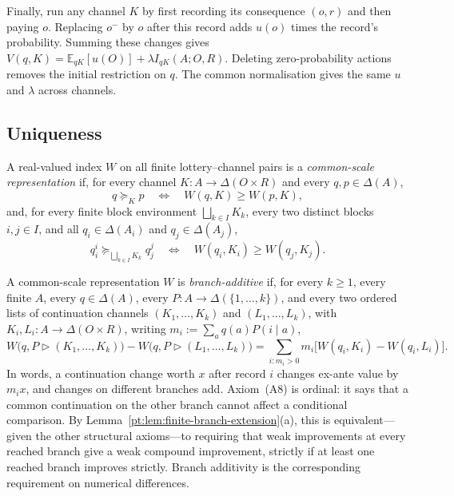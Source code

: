 \documentclass[11pt,a4paper]{article}
\theoremstyle{definition}
\newcommand{\D}{\Delta}
\newcommand{\E}{\mathbb E}
\newcommand{\1}{\mathbf 1}
\begin{document}
Finally, run any channel $K$ by first recording its consequence $(o,r)$ and
then paying $o$. Replacing $o^-$ by $o$ after this record adds $u(o)$ times
the record's probability. Summing these changes gives
$V(q,K)=\E_{qK}[u(O)]+\lambda I_{qK}(A;O,R)$.
Deleting zero-probability actions removes the initial restriction on $q$.
The common normalisation gives the same $u$ and $\lambda$ across channels.

\subsection{Uniqueness}

A real-valued index $W$ on all finite lottery--channel pairs is a \emph{common-scale representation} if, for every channel
$K:A\to\D(O\times R)$ and every $q,p\in\D(A)$,
\[
 q\succeq_Kp
 \quad\Longleftrightarrow\quad
 W(q,K)\ge W(p,K),
\]
and, for every finite block environment $\bigsqcup_{k\in I}K_k$, every two distinct blocks $i,j\in I$, and all
$q_i\in\D(A_i)$ and $q_j\in\D(A_j)$,
\[
 q_i^i\succeq_{\bigsqcup_{k\in I}K_k}q_j^j
 \quad\Longleftrightarrow\quad
 W(q_i,K_i)\ge W(q_j,K_j).
\]

A common-scale representation $W$
is \emph{branch-additive} if, for every $k\ge1$, every finite $A$, every $q\in\D(A)$, every $P:A\to\D(\{1,\ldots,k\})$, and every
two ordered lists of continuation channels $(K_1,\ldots,K_k)$ and $(L_1,\ldots,L_k)$, with
$K_i,L_i:A\to\D(O\times R)$, writing
$m_i:=\sum_aq(a)P(i\mid a)$,
\begin{equation}
 W\bigl(q,P\triangleright(K_1,\ldots,K_k)\bigr)
 -W\bigl(q,P\triangleright(L_1,\ldots,L_k)\bigr)
 =\sum_{i:m_i>0}m_i
 \bigl[W(q_i,K_i)-W(q_i,L_i)\bigr].
 \label{eq:branch-additive-index}
\end{equation}
In words, a continuation change worth $x$ after record $i$ changes ex-ante value by $m_i x$, and changes on
different branches add. Axiom~\textup{(A8)} is ordinal: it says that a common continuation on the other branch cannot affect a conditional
comparison.  By Lemma~\ref{pt:lem:finite-branch-extension}\textup{(a)}, this is equivalent---given the other structural
axioms---to requiring that weak improvements at every reached branch give a weak compound improvement,
strictly if at least one reached branch improves strictly.  Branch additivity is the corresponding requirement
on numerical differences.
\end{document}
